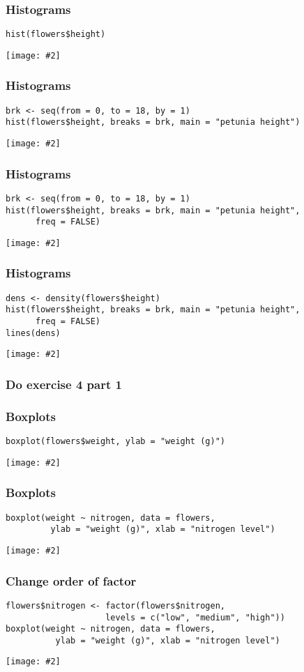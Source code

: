 \documentclass{beamer}
\newcommand{\fig}[2]{\centerline{\texttt{[image: \#2]}}}
\newcommand{\bfr}[1]{\begin{frame}[fragile]\frametitle{{ #1 }}}
\begin{document}
\bfr{Histograms}
{\scriptsize
\begin{verbatim}
hist(flowers$height)
\end{verbatim}
}
\fig{.8}{plot7-1.png}
\end{frame}


\bfr{Histograms}
{\scriptsize
\begin{verbatim}
brk <- seq(from = 0, to = 18, by = 1)
hist(flowers$height, breaks = brk, main = "petunia height")
\end{verbatim}
}
\fig{.8}{plot8-1.png}
\end{frame}

\bfr{Histograms}
{\scriptsize
\begin{verbatim}
brk <- seq(from = 0, to = 18, by = 1)
hist(flowers$height, breaks = brk, main = "petunia height",
      freq = FALSE)
\end{verbatim}
}
\fig{.8}{plot9-1.png}
\end{frame}

\bfr{Histograms}
{\scriptsize
\begin{verbatim}
dens <- density(flowers$height)
hist(flowers$height, breaks = brk, main = "petunia height",
      freq = FALSE)
lines(dens)
\end{verbatim}
}
\fig{.8}{plot10-1.png}
\end{frame}

\bfr{Do exercise 4 part 1}
\end{frame}

\bfr{Boxplots}
{\scriptsize
\begin{verbatim}
boxplot(flowers$weight, ylab = "weight (g)")
\end{verbatim}
}
\fig{0.8}{plot11-1.png}
\end{frame}

\bfr{Boxplots}
{\scriptsize
\begin{verbatim}
boxplot(weight ~ nitrogen, data = flowers, 
         ylab = "weight (g)", xlab = "nitrogen level")
\end{verbatim}
}
\fig{0.8}{plot12-1.png}
\end{frame}


\bfr{Change order of factor}
{\scriptsize
\begin{verbatim}
flowers$nitrogen <- factor(flowers$nitrogen, 
                    levels = c("low", "medium", "high"))
boxplot(weight ~ nitrogen, data = flowers, 
          ylab = "weight (g)", xlab = "nitrogen level")
\end{verbatim}
}
\fig{0.8}{plot13-1.png}
\end{frame}
\end{document}
